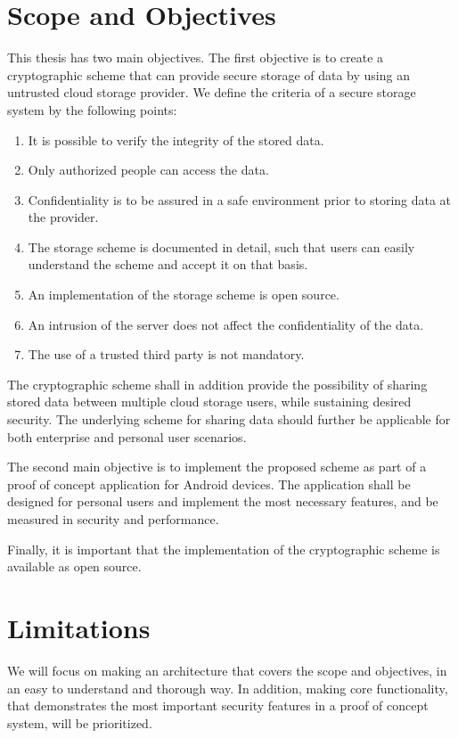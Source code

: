 \documentclass[pdftex,english,10pt,b5paper,twoside]{book}
\begin{document}
\section{Scope and Objectives}
\label{sec:criteria}

This thesis has two main objectives. The first objective is to create
a cryptographic scheme that can provide secure storage of data by using an
untrusted cloud storage provider. We define the criteria of a secure storage
system by the following points:

\begin{enumerate}
  \item It is possible to verify the integrity of the stored data.
  \item Only authorized people can access the data.
  \item Confidentiality is to be assured in a safe environment prior to
  storing data at the provider.
  \item The storage scheme is documented in detail, such that users can
      easily understand the scheme and accept it on that basis.
  \item An implementation of the storage scheme is open source.
  \item An intrusion of the server does not affect the confidentiality of the
  data.
  \item The use of a trusted third party is not mandatory.
\end{enumerate}

The cryptographic scheme shall in addition provide the possibility of sharing
stored data between multiple cloud storage users, while sustaining desired
security. The underlying scheme for sharing data should further be applicable
for both enterprise and personal user scenarios.

The second main objective is to implement the proposed scheme as part of a
proof of concept application for Android devices. The application shall be
designed for personal users and implement the most necessary features,
and be measured in security and performance.

Finally, it is important that the implementation of the cryptographic scheme
is available as open source.

\section{Limitations}

We will focus on making an architecture that covers the scope and objectives,
in an easy to understand and thorough way. In addition, making core
functionality, that demonstrates the most important security features in a proof
of concept system, will be prioritized.
\end{document}
